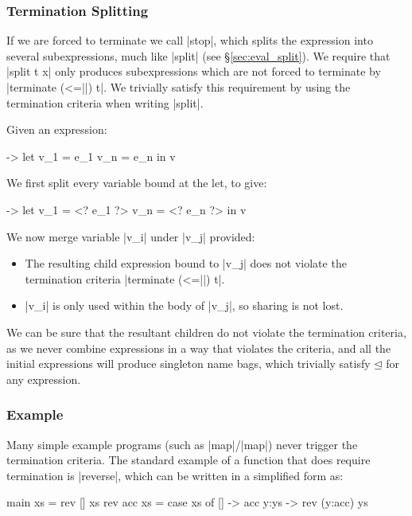 \documentclass[draft]{sigplanconf}
\begin{document}
\subsubsection{Termination Splitting}
\label{sec:term_split}

If we are forced to terminate we call |stop|, which splits the expression into several subexpressions, much like |split| (see \S\ref{sec:eval_split}). We require that |split t x| only produces subexpressions which are not forced to terminate by |terminate (<=||) t|. We trivially satisfy this requirement by using the termination criteria when writing |split|.

Given an expression:

\begin{code}
\free ->  let  v_1 = e_1
               v_n = e_n
          in   v
\end{code}

We first split every variable bound at the let, to give:

\begin{code}
\free ->  let  v_1 = <? e_1 ?>
               v_n = <? e_n ?>
          in   v
\end{code}

We now merge variable |v_i| under |v_j| provided:

\begin{itemize}
\item The resulting child expression bound to |v_j| does not violate the termination criteria |terminate (<=||) t|.
\item |v_i| is only used within the body of |v_j|, so sharing is not lost.
\end{itemize}

We can be sure that the resultant children do not violate the termination criteria, as we never combine expressions in a way that violates the criteria, and all the initial expressions will produce singleton name bags, which trivially satisfy $\unlhd$ for any expression.

\subsubsection{Example}

Many simple example programs (such as |map|/|map|) never trigger the termination criteria. The standard example of a function that does require termination is |reverse|, which can be written in a simplified form as:

\begin{code}
main xs = rev [] xs
rev acc xs = case  xs of
                   []    -> acc
                   y:ys  -> rev (y:acc) ys
\end{code}
\end{document}
